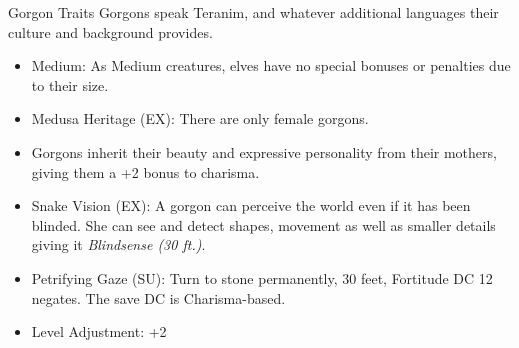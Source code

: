 \begin{35e}{Gorgon Traits}
  Gorgons speak Teranim, and whatever additional languages their culture and
  background provides.

  \begin{itemize}[noitemsep]
    \item Medium: As Medium creatures, elves have no special bonuses or
      penalties due to their size.
    \item Medusa Heritage (EX): There are only female gorgons.
    \item Gorgons inherit their beauty and expressive personality from their
      mothers, giving them a +2 bonus to charisma.
    \item Snake Vision (EX): A gorgon can perceive the world even if it has
      been blinded. She can see and detect shapes, movement as well as smaller
      details giving it \emph{Blindsense (30 ft.)}.
    \item Petrifying Gaze (SU): Turn to stone permanently, 30 feet, Fortitude
      DC 12 negates. The save DC is Charisma-based.
    \item Level Adjustment: +2
  \end{itemize}
\end{35e}
